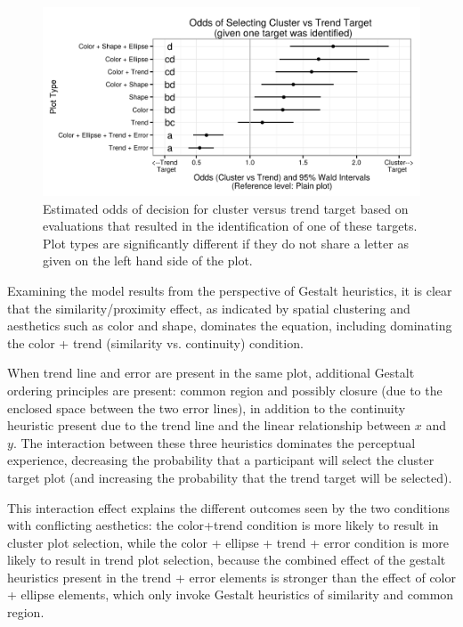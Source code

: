 \documentclass[11pt]{isuthesis}\usepackage[]{graphicx}\usepackage[]{color}
\newenvironment{knitrout}{}{} %
\begin{document}
\begin{figure}[ht]\centering
\begin{knitrout}
\color{fgcolor}

{\centering \includegraphics[width=.85\linewidth]{Figure/FeatureHierarchy/fig-group-vs-line-1} 

}



\end{knitrout}
\caption[Estimated odds of decision for cluster versus trend target]{\label{fig:faceoff} Estimated odds of decision for cluster versus trend target based on evaluations that resulted in the identification of one of these targets. Plot types are significantly different if they do not share a letter as given on the left hand side of the plot.}
\end{figure}

Examining the model results from the perspective of Gestalt heuristics, it is clear that the similarity/proximity effect, as indicated by spatial clustering and aesthetics such as color and shape, dominates the equation, including dominating the color + trend (similarity vs. continuity) condition. 

When trend line and error are present in the same plot, additional Gestalt ordering principles are present: common region and possibly closure (due to the enclosed space between the two error lines), in addition to the continuity heuristic present due to the trend line and the linear relationship between $x$ and $y$. The interaction between these three heuristics dominates the perceptual experience, decreasing the probability that a participant will select the cluster target plot (and increasing the probability that the trend target will be selected). 

This interaction effect explains the different outcomes seen by the two conditions with conflicting aesthetics: the color+trend condition is more likely to result in cluster plot selection, while the color + ellipse + trend + error condition is more likely to result in trend plot selection, because the combined effect of the gestalt heuristics present in the trend + error elements is stronger than the effect of color + ellipse elements, which only invoke Gestalt heuristics of similarity and common region. 
\end{document}
